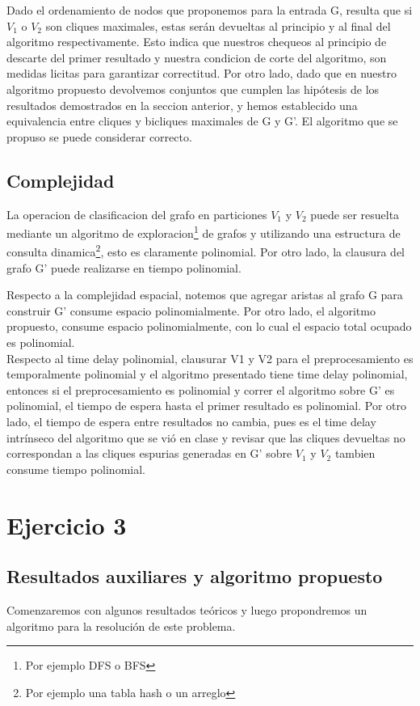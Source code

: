 \documentclass[10pt,a4paper]{article}
\begin{document}
Dado el ordenamiento de nodos que proponemos para la entrada G, resulta que si $V_1$ o $V_2$ son cliques maximales, estas serán devueltas al principio y al final del algoritmo respectivamente. Esto indica que nuestros chequeos al principio de descarte del primer resultado y nuestra condicion de corte del algoritmo, son medidas licitas para garantizar correctitud. Por otro lado, dado que en nuestro algoritmo propuesto devolvemos conjuntos que cumplen las hipótesis de los resultados demostrados en la seccion anterior, y hemos establecido una equivalencia entre cliques y bicliques maximales de G y G'. El algoritmo que se propuso se puede considerar correcto.

\newpage

\subsection{Complejidad}

La operacion de clasificacion del grafo en particiones $V_1$ y $V_2$ puede ser resuelta mediante un algoritmo de exploracion\footnote{Por ejemplo DFS o BFS} de grafos y utilizando una estructura de consulta dinamica\footnote{Por ejemplo una tabla hash o un arreglo}, esto es claramente polinomial. Por otro lado, la clausura del grafo G' puede realizarse en tiempo polinomial.


Respecto a la complejidad espacial, notemos que agregar aristas al grafo G para construir G' consume espacio polinomialmente. Por otro lado, el algoritmo propuesto, consume espacio polinomialmente, con lo cual el espacio total ocupado es polinomial.\\

Respecto al time delay polinomial, clausurar V1 y V2 para el preprocesamiento es temporalmente polinomial y el algoritmo presentado tiene time delay polinomial, entonces si el preprocesamiento es polinomial y correr el algoritmo sobre G' es polinomial, el tiempo de espera hasta el primer resultado es polinomial. Por otro lado, el tiempo de espera entre resultados no cambia, pues es el time delay intr\'inseco del algoritmo que se vi\'o en clase y revisar que las cliques devueltas no correspondan a las cliques espurias generadas en G' sobre $V_1$ y $V_2$ tambien consume tiempo polinomial.

\section{Ejercicio 3}
\subsection{Resultados auxiliares y algoritmo propuesto}
Comenzaremos con algunos resultados teóricos y luego propondremos un algoritmo para la resolución de este problema.
\end{document}
